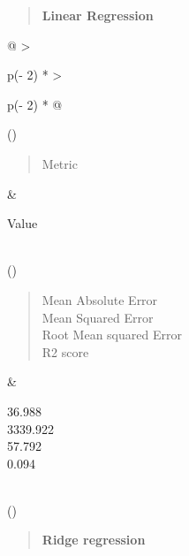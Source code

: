 \documentclass[
]{article}
\begin{document}
\begin{quote}
\textbf{Linear Regression}
\end{quote}

\begin{longtable}[]{@{}
  >{\raggedright\arraybackslash}p{(\columnwidth - 2\tabcolsep) * }
  >{\raggedright\arraybackslash}p{(\columnwidth - 2\tabcolsep) * }@{}}
\toprule()
\begin{minipage}[b]{\linewidth}\raggedright
\begin{quote}
Metric
\end{quote}
\end{minipage} & \begin{minipage}[b]{\linewidth}\raggedright
Value
\end{minipage} \\
\midrule()
\endhead
\begin{minipage}[t]{\linewidth}\raggedright
\begin{quote}
Mean Absolute Error\\
Mean Squared Error\\
Root Mean squared Error\\
R2 score
\end{quote}\strut
\end{minipage} & \begin{minipage}[t]{\linewidth}\raggedright
36.988\\
3339.922\\
57.792\\
0.094\strut
\end{minipage} \\
\bottomrule()
\end{longtable}

\begin{quote}
\textbf{Ridge regression}
\end{quote}
\end{document}
